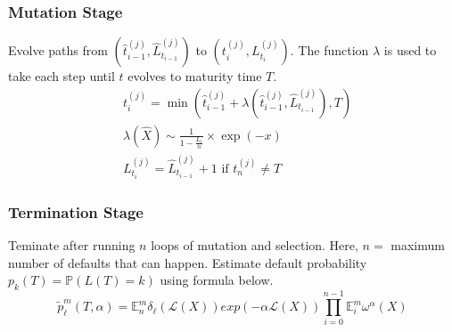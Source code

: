 \subsubsection{Mutation Stage}
Evolve paths from $\left( \hat{t}_{i-1}^{(j)}, \hat{L}_{t_{i-1}}^{(j)}\right)$ to $\left(t^{(j)}_{i}, L_{t_{i}}^{(j)} \right)$.
The function $\lambda$ is used to take each step until $t$ evolves to maturity time $T$. 
		\begin{equation*}
				\begin{split}
					&t^{(j)}_{i}= \min\left(\hat{t}^{(j)}_{i-1} + \lambda\left(\hat{t}^{(j)}_{i-1},\hat{L}_{t_{i-1}}^{(j)}\right),T\right) \\
					& \lambda\left(\hat{X}\right) \sim \frac{1}{1-\frac{L_{t}}{n}} \times \exp(-x) \\
					&L_{t_{i}}^{(j)} = \hat{L}_{t_{i-1}}^{(j)} + 1 \text{ if } t^{(j)}_{n} 		\neq T					
				\end{split}	
		\end{equation*}

\subsubsection{Termination Stage}
Teminate after running $n$ loops of mutation and selection. Here, $n =$ maximum number of defaults that can happen.
 Estimate default probability $p_k(T) = \mathbb{P}\left( L\left( T \right) = k
		      \right)$ using formula below.
\begin{equation*}
	\tilde{p}^m_{\ell}(T,\alpha) = \mathbb{E}^{m}_{n}{\delta_{\ell}(\mathcal{L}(X))exp(-\alpha \mathcal{L}(X))}\prod_{i=0}^{n-1}\mathbb{E}_{i}^{m}\omega^{\alpha}(X)
\end{equation*}
